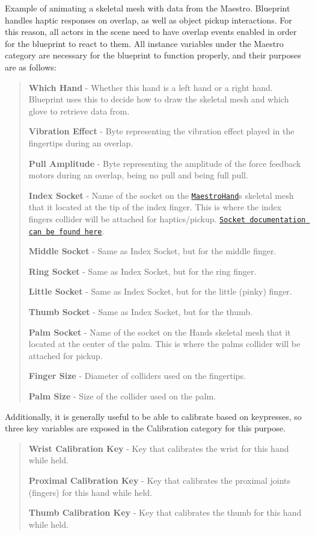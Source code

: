 Example of animating a skeletal mesh with data from the Maestro. Blueprint handles haptic responses on overlap, as well as object pickup interactions. For this reason, all actors in the scene need to have overlap events enabled in order for the blueprint to react to them. All instance variables under the Maestro category are necessary for the blueprint to function properly, and their purposes are as follows\+: \begin{quote}
{\bfseries Which Hand} -\/ Whether this hand is a left hand or a right hand. Blueprint uses this to decide how to draw the skeletal mesh and which glove to retrieve data from.

{\bfseries Vibration Effect} -\/ Byte representing the vibration effect played in the fingertips during an overlap.

{\bfseries Pull Amplitude} -\/ Byte representing the amplitude of the force feedback motors during an overlap, {} being no pull and {} being full pull.

{\bfseries Index Socket} -\/ Name of the socket on the \href{#maestrohand}{\tt Maestro\+Hand}\textquotesingle{}s skeletal mesh that it located at the tip of the index finger. This is where the index finger\textquotesingle{}s collider will be attached for haptics/pickup. \href{https://docs.unrealengine.com/latest/INT/Engine/Content/Types/SkeletalMeshes/Sockets/}{\tt Socket documentation can be found here}.

{\bfseries Middle Socket} -\/ Same as Index Socket, but for the middle finger.

{\bfseries Ring Socket} -\/ Same as Index Socket, but for the ring finger.

{\bfseries Little Socket} -\/ Same as Index Socket, but for the little (pinky) finger.

{\bfseries Thumb Socket} -\/ Same as Index Socket, but for the thumb.

{\bfseries Palm Socket} -\/ Name of the socket on the Hand\textquotesingle{}s skeletal mesh that it located at the center of the palm. This is where the palm\textquotesingle{}s collider will be attached for pickup.

{\bfseries Finger Size} -\/ Diameter of colliders used on the fingertips.

{\bfseries Palm Size} -\/ Size of the collider used on the palm. \end{quote}


Additionally, it is generally useful to be able to calibrate based on keypresses, so three key variables are exposed in the Calibration category for this purpose. \begin{quote}
{\bfseries Wrist Calibration Key} -\/ Key that calibrates the wrist for this hand while held.

{\bfseries Proximal Calibration Key} -\/ Key that calibrates the proximal joints (fingers) for this hand while held.

{\bfseries Thumb Calibration Key} -\/ Key that calibrates the thumb for this hand while held. \end{quote}


